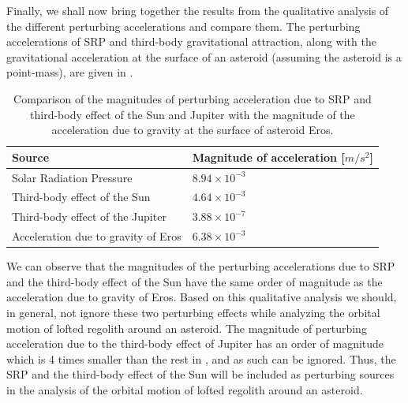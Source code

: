 Finally, we shall now bring together the results from the qualitative analysis of the different perturbing accelerations and compare them. The perturbing accelerations of \gls{SRP} and third-body gravitational attraction, along with the gravitational acceleration at the surface of an asteroid (assuming the asteroid is a point-mass), are given in .
%
\begin{table}[htb]
\centering
\caption{Comparison of the magnitudes of perturbing acceleration due to \gls{SRP} and third-body effect of the Sun and Jupiter with the magnitude of the acceleration due to gravity at the surface of asteroid Eros.}
    \begin{tabular}{ll}
    \hline
    Source                                  & Magnitude of acceleration [$m/s^2$]       \\
    \hline
    Solar Radiation Pressure                & $8.94 \times 10^{-3}$                     \\
    Third-body effect of the Sun            & $4.64 \times 10^{-3}$                     \\
    Third-body effect of the Jupiter        & $3.88 \times 10^{-7}$                     \\
    Acceleration due to gravity of Eros     & $6.38 \times 10^{-3}$                     \\
    \hline
    \end{tabular}
\label{tab:perturbing_accelerations}
\end{table}
%
We can observe that the magnitudes of the perturbing accelerations due to \gls{SRP} and the third-body effect of the Sun have the same order of magnitude as the acceleration due to gravity of Eros. Based on this qualitative analysis we should, in general, not ignore these two perturbing effects while analyzing the orbital motion of lofted regolith around an asteroid. The magnitude of perturbing acceleration due to the third-body effect of Jupiter has an order of magnitude which is 4 times smaller than the rest in , and as such can be ignored. Thus, the \gls{SRP} and the third-body effect of the Sun will be included as perturbing sources in the analysis of the orbital motion of lofted regolith around an asteroid.
